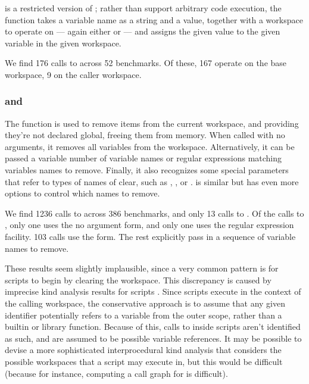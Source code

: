 \subsubsection{}

 is a restricted version of ; rather than support
arbitrary code execution, the function takes a variable name as a string and a
value, together with a workspace to operate on --- again either 
or  --- and assigns the given value to the given variable in the
given workspace.

We find 176 calls to  across 52 benchmarks. Of these, 167
operate on the base workspace, 9 on the caller workspace.

\subsubsection{ and }

The  function is used to remove items from the current workspace,
and providing they're not declared global, freeing them from memory. When
called with no arguments, it removes all variables from the workspace.
Alternatively, it can be passed a variable number of variable names or regular
expressions matching variables names to remove. Finally, it also recognizes
some special parameters that refer to types of names of clear, such as
, , or .  is similar
but has even more options to control which names to remove.

We find 1236 calls to  across 386 benchmarks, and only 13 calls to
. Of the calls to , only one uses the no argument
form, and only one uses the regular expression facility. 103 calls use the
 form. The rest explicitly pass in a sequence of variable names
to remove.


These results seem slightly implausible, since a very common pattern is for
\matlab scripts to begin by clearing the workspace. This discrepancy is caused
by imprecise kind analysis results for scripts \cite{KindAnalysis}. Since
scripts execute in the context of the calling workspace, the conservative
approach is to assume that any given identifier potentially refers to a
variable from the outer scope, rather than a builtin or library function.
Because of this, calls to  inside scripts aren't identified as
such, and are assumed to be possible variable references. It may be possible to
devise a more sophisticated interprocedural kind analysis that considers the
possible workspaces that a script may execute in, but this would be difficult
(because for instance, computing a call graph for \matlab is difficult).

